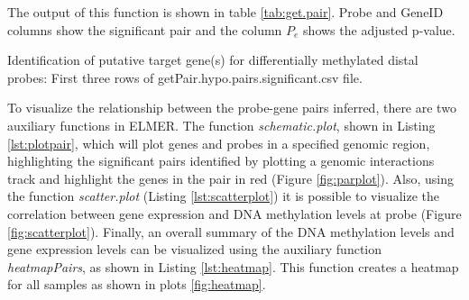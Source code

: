 


The output of this function is shown in table \ref{tab:get.pair}. Probe and GeneID
columns show the significant pair and the column $P_e$ shows the adjusted p-value.
\begin{table}[h!]
\centering
\small
{}
\caption [Identification of putative target gene(s) for differentially methylated distal probes]{
Identification of putative target gene(s) for differentially methylated distal probes: First three rows of  getPair.hypo.pairs.significant.csv file.
}
\label{tab:get.pair}
\end{table}

To visualize the relationship between the probe-gene pairs inferred, there are two auxiliary functions in ELMER. The function \textit{schematic.plot}, shown in Listing \ref{lst:plotpair}, which will plot genes and probes in a specified genomic region, highlighting the significant pairs identified by plotting a genomic interactions track and highlight the genes in the pair in red (Figure \ref{fig:parplot}). Also,  using the function \textit{scatter.plot} (Listing \ref{lst:scatterplot}) it is possible to visualize the correlation between gene expression and DNA methylation levels at probe (Figure \ref{fig:scatterplot}).
 Finally, an overall summary of the DNA  methylation levels and gene expression levels  can be visualized using the auxiliary function \textit{heatmapPairs}, as shown in Listing \ref{lst:heatmap}. This function creates a heatmap for all samples  as shown in plots \ref{fig:heatmap}.



